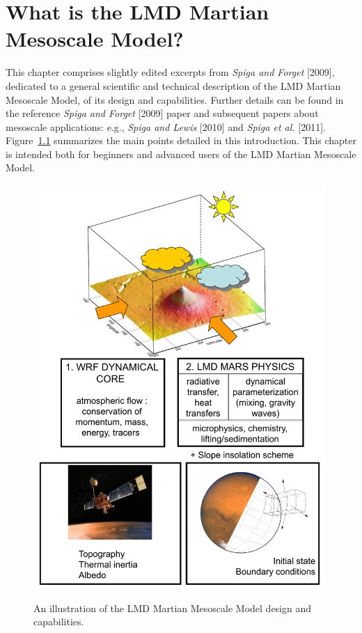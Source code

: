 \chapter{What is the LMD Martian Mesoscale Model?}\label{whatis}

\vk
This chapter comprises slightly edited excerpts from \textit{Spiga and Forget} [2009]\nocite{Spig:09}, dedicated to a general scientific and technical description of the LMD Martian Mesoscale Model, of its design and capabilities. Further details can be found in the reference \textit{Spiga and Forget} [2009]\nocite{Spig:09} paper and subsequent papers about mesoscale applications: e.g., \textit{Spiga and Lewis} [2010]\nocite{Spig:10dust} and \textit{Spiga et al.} [2011]\nocite{Spig:11ti}. Figure~\ref{modelstructure} summarizes the main points detailed in this introduction. This chapter is intended both for beginners and advanced users of the LMD Martian Mesoscale Model.

\begin{center}
\begin{figure}[p] 
\includegraphics[width=0.99\textwidth]{meso.pdf} 
\caption{\label{modelstructure} An illustration of the LMD Martian Mesoscale Model design and capabilities.}
\end{figure}
\end{center}

